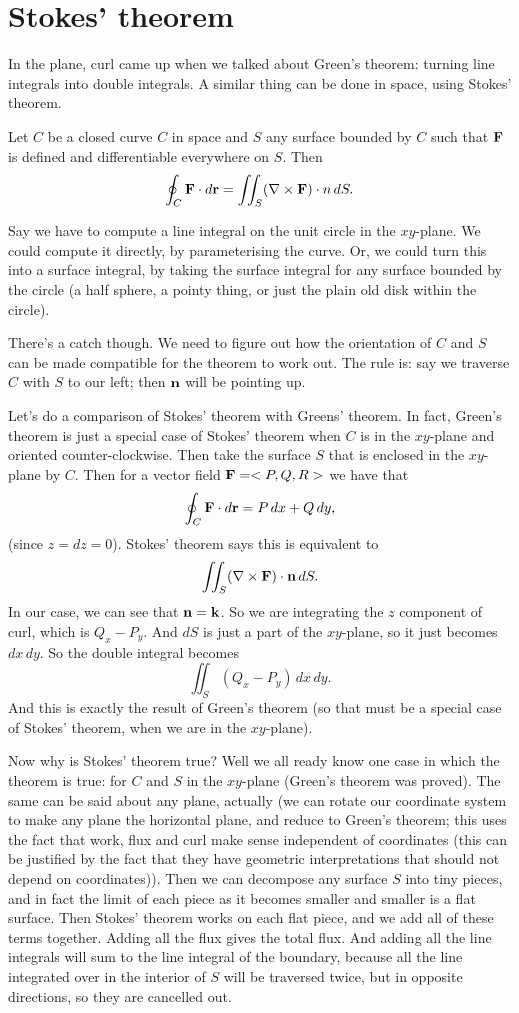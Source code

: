 \section{Stokes' theorem}

In the plane, curl came up when we talked about Green's theorem: turning line integrals into double integrals. A similar thing can be done in space, using Stokes' theorem.

Let $C$ be a closed curve $C$ in space and $S$ any surface bounded by $C$ such that $\boldsymbol{\mathbf{F}}$ is defined and differentiable everywhere on $S$. Then
\[ \oint_C \boldsymbol{\mathbf{F}} \cdot d\boldsymbol{\mathbf{r}} = \iint_S(\nabla \times \boldsymbol{\mathbf{F}})\cdot n\,dS. \]
\etm

\bex
Say we have to compute a line integral on the unit circle in the $xy$-plane. We could compute it directly, by parameterising the curve. Or, we could turn this into a surface integral, by taking the surface integral for any surface bounded by the circle (a half sphere, a pointy thing, or just the plain old disk within the circle). 
\eex

There's a catch though. We need to figure out how the orientation of $C$ and $S$ can be made compatible for the theorem to work out. The rule is: say we traverse $C$ with $S$ to our left; then $\boldsymbol{\mathbf{n}}$ will be pointing up. 

\bex
Let's do a comparison of Stokes' theorem with Greens' theorem. In fact, Green's theorem is just a special case of Stokes' theorem when $C$ is in the $xy$-plane and oriented counter-clockwise. Then take the surface $S$ that is enclosed in the $xy$-plane by $C$. Then for a vector field $\boldsymbol{\mathbf{F}} = <P,Q,R>$ we have that
\[ \oint_C \boldsymbol{\mathbf{F}} \cdot d\boldsymbol{\mathbf{r}} = P\,dx + Q\,dy, \]
(since $z = dz = 0$). Stokes' theorem says this is equivalent to
\[ \iint_S (\nabla \times \boldsymbol{\mathbf{F}}) \cdot \boldsymbol{\mathbf{n}} \, dS. \]
In our case, we can see that $\boldsymbol{\mathbf{n}} = \boldsymbol{\mathbf{k}}$. So we are integrating the $z$ component of curl, which is $Q_x - P_y$. And $dS$ is just a part of the $xy$-plane, so it just becomes $dx\,dy$. So the double integral becomes
\[ \iint_S (Q_x - P_y)\,dx\,dy. \]
And this is exactly the result of Green's theorem (so that must be a special case of Stokes' theorem, when we are in the $xy$-plane).
\eex

Now why is Stokes' theorem true?
Well we all ready know one case in which the theorem is true: for $C$ and $S$ in the $xy$-plane (Green's theorem was proved). The same can be said about any plane, actually (we can rotate our coordinate system to make any plane the horizontal plane, and reduce to Green's theorem; this uses the fact that work, flux and curl make sense independent of coordinates (this can be justified by the fact that they have geometric interpretations that should not depend on coordinates)). Then we can decompose any surface $S$ into tiny pieces, and in fact the limit of each piece as it becomes smaller and smaller is a flat surface. Then Stokes' theorem works on each flat piece, and we add all of these terms together. Adding all the flux gives the total flux. And adding all the line integrals will sum to the line integral of the boundary, because all the line integrated over in the interior of $S$ will be traversed twice, but in opposite directions, so they are cancelled out. 
\epf

